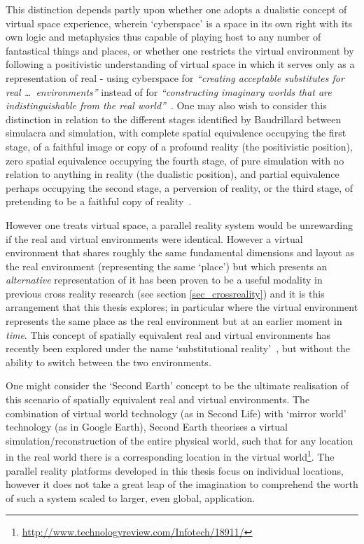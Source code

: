 This distinction depends partly upon whether one adopts a dualistic concept of virtual space experience, wherein `cyberspace' is a space in its own right with its own logic and metaphysics thus capable of playing host to any number of fantastical things and places, or whether one restricts the virtual environment by following a positivistic understanding of virtual space in which it serves only as a representation of real - using cyberspace for \textit{``creating acceptable substitutes for real \ldots\ environments''} instead of for \textit{``constructing imaginary worlds that are indistinguishable from the real world''}~\cite{Qvortrup2002}. One may also wish to consider this distinction in relation to the different stages identified by Baudrillard between simulacra and simulation, with complete spatial equivalence occupying the first stage, of a faithful image or copy of a profound reality (the positivistic position), zero spatial equivalence occupying the fourth stage, of pure simulation with no relation to anything in reality (the dualistic position), and partial equivalence perhaps occupying the second stage, a perversion of reality, or the third stage, of pretending to be a faithful copy of reality~\cite{Baudrillard1994}.


However one treats virtual space, a parallel reality system would be unrewarding if the real and virtual environments were identical\turklevrfootnote{}. However a virtual environment that shares roughly the same fundamental dimensions and layout as the real environment (representing the same `place') but which presents an \textit{alternative} representation of it has been proven to be a useful modality in previous cross reality research (see section \ref{sec_crossreality}) and it is this arrangement that this thesis explores; in particular where the virtual environment represents the same place as the real environment but at an earlier moment in \textit{time}. This concept of spatially equivalent real and virtual environments has recently been explored under the name `substitutional reality'~\cite{Simeone2015}, but without the ability to switch between the two environments.

One might consider the `Second Earth' concept to be the ultimate realisation of this scenario of spatially equivalent real and virtual environments. The combination of virtual world technology (as in Second Life) with `mirror world' technology (as in Google Earth), Second Earth theorises a virtual simulation/reconstruction of the entire physical world, such that for any location in the real world there is a corresponding location in the virtual world\footnote{\url{http://www.technologyreview.com/Infotech/18911/}}. The parallel reality platforms developed in this thesis focus on individual locations, however it does not take a great leap of the imagination to comprehend the worth of such a system scaled to larger, even global, application.

